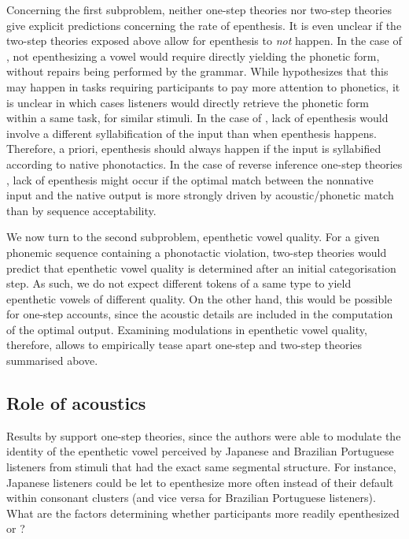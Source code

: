 Concerning the first subproblem, neither one-step theories nor two-step theories give explicit predictions concerning the rate of epenthesis. It is even unclear if the two-step theories exposed above allow for epenthesis to \textit{not} happen. In the case of \cite{berent2007}, not epenthesizing a vowel would require directly yielding the phonetic form, without repairs being performed by the grammar. While \cite{berent2007} hypothesizes that this may happen in tasks requiring participants to pay more attention to phonetics, it is unclear in which cases listeners would directly retrieve the phonetic form within a same task, for similar stimuli. In the case of \cite{monahan2009}, lack of epenthesis would involve a different syllabification of the input than when epenthesis happens. Therefore, a priori, epenthesis should always happen if the input is syllabified according to native phonotactics. In the case of reverse inference one-step theories \cite{dupoux2011, wilson2013, durvasula2015}, lack of epenthesis might occur if the optimal match between the nonnative input and the native output is more strongly driven by acoustic/phonetic match than by sequence acceptability.   

We now turn to the second subproblem, epenthetic vowel quality. For a given phonemic sequence containing a phonotactic violation, two-step theories would predict that epenthetic vowel quality is determined after an initial categorisation step. As such, we do not expect different tokens of a same type to yield epenthetic vowels of different quality. On the other hand, this would be possible for one-step accounts, since the acoustic details are included in the computation of the optimal output. Examining modulations in epenthetic vowel quality, therefore, allows to empirically tease apart one-step and two-step theories summarised above.      

\subsection{Role of acoustics}
Results by \cite{dupoux2011} support one-step theories, since the authors were able to modulate the identity of the epenthetic vowel perceived by Japanese and Brazilian Portuguese listeners from stimuli that had the exact same segmental structure. For instance, Japanese listeners could be let to epenthesize  more often instead of their default  within consonant clusters (and vice versa for Brazilian Portuguese listeners). What are the factors determining whether participants more readily epenthesized  or ?

